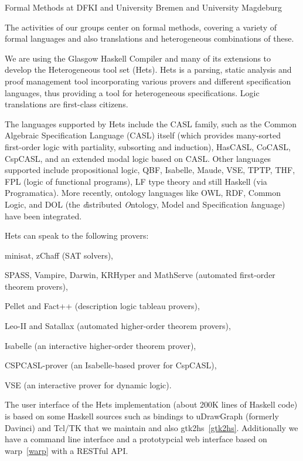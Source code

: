 \begin{hcarentry}[section]{Formal Methods at DFKI and University Bremen and University Magdeburg}
\makeheader

The activities of our groups center on formal methods, covering a
variety of formal languages and also translations and heterogeneous
combinations of these.

We are using the Glasgow Haskell Compiler and many of its extensions
to develop the Heterogeneous tool set (Hets).  Hets is a parsing,
static analysis and proof management tool incorporating various
provers and different specification languages, thus providing a tool
for heterogeneous specifications. Logic translations are first-class
citizens.

The languages supported by Hets include the CASL family, such as the Common
Algebraic Specification Language (CASL) itself (which provides many-sorted
first-order logic with partiality, subsorting and induction), HasCASL, CoCASL,
CspCASL, and an extended modal logic based on CASL. Other languages supported
include propositional logic, QBF, Isabelle, Maude, VSE, TPTP, THF, FPL (logic
of functional programs), LF type theory and still Haskell (via
Programatica). More recently, ontology languages like OWL, RDF, Common Logic,
and DOL (the \emph{d}istributed \emph{O}ntology, Model and Specification
\emph{l}anguage) have been integrated.

Hets can speak to the following provers:
\begin{compactitem}
\item
minisat, zChaff (SAT solvers),
\item
SPASS, Vampire, Darwin, KRHyper and MathServe (automated first-order theorem provers),
\item
Pellet and Fact++ (description logic tableau provers),
\item
Leo-II and Satallax (automated higher-order theorem provers),
\item
Isabelle (an interactive higher-order theorem prover),
\item
CSPCASL-prover (an Isabelle-based prover for CspCASL),
\item VSE (an interactive prover for dynamic logic).
\end{compactitem}

The user interface of the Hets implementation (about 200K lines of
Haskell code) is based on some Haskell sources such as bindings to
uDrawGraph (formerly Davinci) and Tcl/TK that we maintain and also
gtk2hs~\cref{gtk2hs}.  Additionally we have a command line interface
and a prototypcial web interface based on warp~\cref{warp} with a
RESTful API.


\end{hcarentry}
